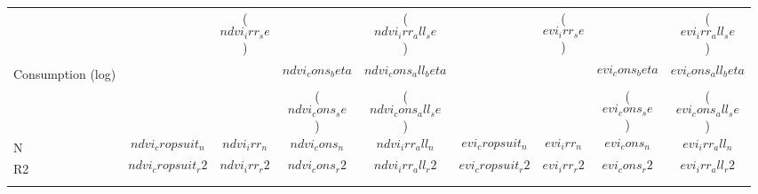 \begin{center}
{\begin{tabular}{l c c c c c c c c}
                       &                              &  ($$ndvi_irr_se$$)                  &                                     & ($$ndvi_irr_all_se$$)           &                             &  ($$evi_irr_se$$)                  &                                    & ($$evi_irr_all_se$$)          \\
                       &                              &                                     &                                     &                                 &                             &                                    &                                    &                                 \\
Consumption (log)      &                              &                                     & $$ndvi_cons_beta$$              & $$ndvi_cons_all_beta$$      &                             &                                    & $$evi_cons_beta$$              & $$evi_cons_all_beta$$     \\
                       &                              &                                     & ($$ndvi_cons_se$$)                  & ($$ndvi_cons_all_se$$)          &                             &                                    & ($$evi_cons_se$$)                  & ($$evi_cons_all_se$$)         \\
\hline                                                                                                                                                                                                                                                                                                          
N                      & $$ndvi_cropsuit_n$$          & $$ndvi_irr_n$$                      & $$ndvi_cons_n$$                     & $$ndvi_irr_all_n$$              & $$evi_cropsuit_n$$          & $$evi_irr_n$$                      & $$evi_cons_n$$                     & $$evi_irr_all_n$$             \\
R2                     & $$ndvi_cropsuit_r2$$         & $$ndvi_irr_r2$$                     & $$ndvi_cons_r2$$                    & $$ndvi_irr_all_r2$$             & $$evi_cropsuit_r2$$         & $$evi_irr_r2$$                     & $$evi_cons_r2$$                    & $$evi_irr_all_r2$$            \\
\hline \\


\end{tabular}}
\end{center}

